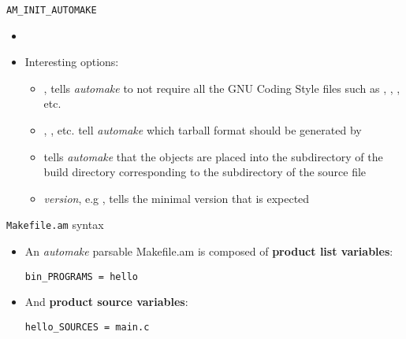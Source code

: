 \begin{frame}{{\tt AM\_INIT\_AUTOMAKE}}

  \begin{itemize}
  \item {}
  \item Interesting options:
    \begin{itemize}
    \item {}, tells {\em automake} to not require all the
      GNU Coding Style files such as , ,
      , etc.
    \item {}, , etc. tell {\em automake}
      which tarball format should be generated by 
    \item {} tells {\em automake} that the objects
      are placed into the subdirectory of the build directory
      corresponding to the subdirectory of the source file
    \item {\em version}, e.g , tells the minimal
       version that is expected
    \end{itemize}
  \end{itemize}
\end{frame}

\begin{frame}[fragile]{{\tt Makefile.am} syntax}
  \begin{itemize}
  \item An {\em automake} parsable Makefile.am is composed of {\bf
      product list variables}:
    \begin{block}{}
\begin{verbatim}
bin_PROGRAMS = hello
\end{verbatim}
\end{block}
  \item And {\bf product source variables}:
    \begin{block}{}
\begin{verbatim}
hello_SOURCES = main.c
\end{verbatim}
\end{block}

\end{itemize}
\end{frame}

